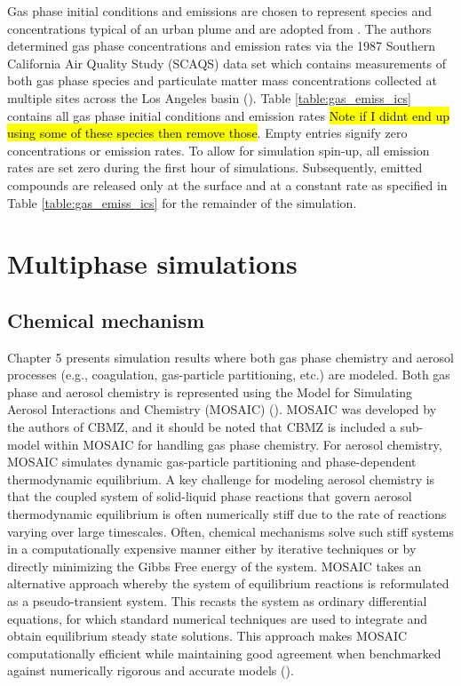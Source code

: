 Gas phase initial conditions and emissions are chosen to represent species and concentrations typical of an urban plume and are adopted from \cite{riemer_simulating_2009}. The authors determined gas phase concentrations and emission rates via the 1987 Southern California Air Quality Study (SCAQS) data set which contains measurements of both gas phase species and particulate matter mass concentrations collected at multiple sites across the Los Angeles basin (\cite{zaveri_model_2008}). Table \ref{table:gas_emiss_ics} contains all gas phase initial conditions and emission rates \hl{Note if I didnt end up using some of these species then remove those}. Empty entries signify zero concentrations or emission rates. To allow for simulation spin-up, all emission rates are set zero during the first hour of simulations. Subsequently, emitted compounds are released only at the surface and at a constant rate as specified in Table \ref{table:gas_emiss_ics} for the remainder of the simulation.



\section{Multiphase simulations}
\subsection{Chemical mechanism}
Chapter 5 presents simulation results where both gas phase chemistry and aerosol processes (e.g., coagulation, gas-particle partitioning, etc.) are modeled. Both gas phase and aerosol chemistry is represented using the Model for Simulating Aerosol Interactions and Chemistry (MOSAIC) (\cite{zaveri_model_2008}). MOSAIC was developed by the authors of CBMZ, and it should be noted that CBMZ is included a sub-model within MOSAIC for handling gas phase chemistry. For aerosol chemistry, MOSAIC simulates dynamic gas-particle partitioning and phase-dependent thermodynamic equilibrium. A key challenge for modeling aerosol chemistry is that the coupled system of solid-liquid phase reactions that govern aerosol thermodynamic equilibrium is often numerically stiff due to the rate of reactions varying over large timescales. Often, chemical mechanisms solve such stiff systems in a computationally expensive manner either by iterative techniques or by directly minimizing the Gibbs Free energy of the system. MOSAIC takes an alternative approach whereby the system of equilibrium reactions is reformulated as a pseudo-transient system. This recasts the system as ordinary differential equations, for which standard numerical techniques are used to integrate and obtain equilibrium steady state solutions. This approach makes MOSAIC computationally efficient while maintaining good agreement when benchmarked against numerically rigorous and accurate models (\cite{zaveri_model_2008}).


